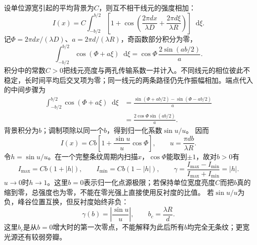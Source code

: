 \documentclass[UTF8,fontset=fandol,a4paper,11pt]{ctexart}
\newcommand{\dd}{\mathop{}\!\mathrm{d}}
\begin{document}
设单位源宽引起的平均背景为$C$，则互不相干线元的强度相加：
\[
I(x)=C\int_{-b/2}^{b/2}
\left[1+\cos\left(\frac{2\pi dx}{\lambda D}
+\frac{2\pi d\xi}{\lambda R}\right)\right]\dd\xi.
\]
记$\Phi=2\pi dx/(\lambda D)$、$a=2\pi d/(\lambda R)$，奇函数部分积分为零，
\[
\int_{-b/2}^{b/2}\cos(\Phi+a\xi)\dd\xi
=\cos\Phi\,\frac{2\sin(ab/2)}a.
\]
积分中的常数$C>0$把线元亮度与两孔传输系数一并计入。不同线元的相位彼此不稳定，长时间平均后交叉项为零；同一线元的两条路径仍先作振幅相加。端点代入的中间步骤为
\[
\begin{split}
\int_{-b/2}^{b/2}\cos(\Phi+a\xi)\dd\xi
&=\frac{\sin(\Phi+ab/2)-\sin(\Phi-ab/2)}a\\
&=\frac{2\cos\Phi\sin(ab/2)}a.
\end{split}
\]
背景积分为$b$；调制项除以同一个$b$，得到归一化系数$\sin u/u$。
因而
\[
I(x)=Cb\left[1+\frac{\sin u}{u}\cos\Phi\right],
\qquad u=\frac{\pi db}{\lambda R}.
\]
令$h=\sin u/u$。在一个完整条纹周期内扫描$x$，$\cos\Phi$能取到$\pm1$，故对$b>0$有
\[
I_{\max}=Cb(1+|h|),\qquad I_{\min}=Cb(1-|h|),\qquad
\gamma=\frac{I_{\max}-I_{\min}}{I_{\max}+I_{\min}}=|h|.
\]
$u\to0$时$h\to1$。这里$b=0$表示归一化点源极限；若保持单位宽度亮度$C$而把$b$真的缩到零，总强度也为零，不能在零光强上直接使用反衬度的比值。
若$\sin u/u$为负，峰谷位置互换，但反衬度始终非负：
\[
\boxed{\gamma(b)=\left|\frac{\sin u}{u}\right|,\qquad
b_c=\frac{\lambda R}{d}}.
\]
这里$b_c$是从$b=0$增大时的第一次零点，不能解释为此后所有$b$均完全无条纹；更宽光源还有较弱旁瓣。
\end{document}
